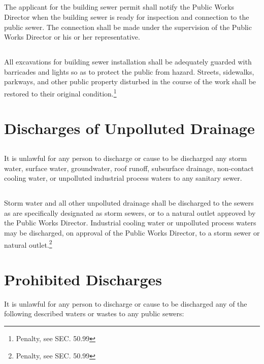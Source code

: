 \subsection{}
The applicant for the building sewer permit shall notify the Public Works Director when the building sewer is ready for inspection and connection to the public sewer.  The connection shall be made under the supervision of the Public Works Director or his or her representative.
\subsection{}
All excavations for building sewer installation shall be adequately guarded with barricades and lights so as to protect the public from hazard.  Streets, sidewalks, parkways, and other public property disturbed in the course of the work shall be restored to their original condition.\footnote{Penalty, see SEC. 50.99}

\section{Discharges of Unpolluted Drainage}
\subsection{}
It is unlawful for any person to discharge or cause to be discharged any storm water, surface water, groundwater, roof runoff, subsurface drainage, non-contact cooling water, or unpolluted industrial process waters to any sanitary sewer.
\subsection{}
Storm water and all other unpolluted drainage shall be discharged to the sewers as are specifically designated as storm sewers, or to a natural outlet approved by the Public Works Director.  Industrial cooling water or unpolluted process waters may be discharged, on approval of the Public Works Director, to a storm sewer or natural outlet.\footnote{Penalty, see SEC. 50.99}

\section{Prohibited Discharges}
It is unlawful for any person to discharge or cause to be discharged any of the following described waters or wastes to any public sewers:
